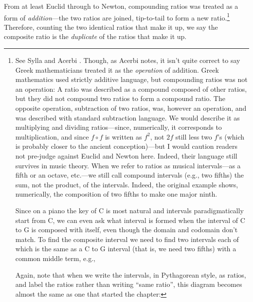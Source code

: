 \documentclass[11pt]{article}
\newcommand{\flushleftright}{\noindent\justifying}
\begin{document}
From at least Euclid through to Newton, compounding ratios was treated as a form of \textit{addition}---the two ratios are joined, tip-to-tail to form a new ratio.\footnote{See Sylla \citep{sylla1984} and Acerbi \citep{acerbi2011}. Though, as Acerbi notes, it isn't quite correct to say Greek mathematicians treated it as the \textit{operation }of addition. Greek mathematics used strictly additive language, but compounding ratios was not an operation: A ratio was described as a compound composed of other ratios, but they did not compound two ratios to form a compound ratio. The opposite operation, subtraction of two ratios, was, however an operation, and was described with standard subtraction language. We would describe it as multiplying and dividing ratios---since, numerically, it corresponds to multiplication, and since $f\circ f$ is written as $f^2$, not $2f$ still less two $f$'s (which is probably closer to the ancient conception)---but I would caution readers not pre-judge against Euclid and Newton here. Indeed, their language still survives in music theory. When we refer to ratios as musical intervals---as a fifth or an octave, etc.---we still call compound intervals (e.g., two fifths) the sum, not the product, of the intervals. Indeed, the original example shows, numerically, the composition of two fifths to make one major ninth.

Since on a piano the key of C is most natural and intervals paradigmatically start from C, we can even ask what interval is formed when the interval of C to G is composed with itself, even though the domain and codomain don't match. To find the composite interval we need to find two intervals each of which is the same as a C to G interval (that is, we need two fifths) with a common middle term, e.g.,

\centering%

\flushleftright%
Again, note that when we write the intervals, in Pythagorean style, as ratios, and label the ratios rather than writing ``same ratio'', this diagram becomes almost the same as one that started the chapter:

\centering%

\flushleftright%
} Therefore, counting the two identical ratios that make it up, we say the composite ratio is the \textit{duplicate} of the ratios that make it up.
\end{document}
